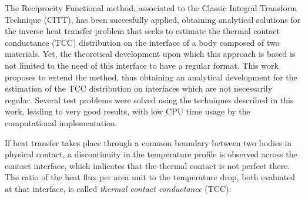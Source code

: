 \documentclass[conference,compsoc,fleqn]{IEEEtran}
\begin{document}




\maketitle


The Reciprocity Functional method, associated to the Classic Integral Transform Technique (CITT), has been succesfully applied, obtaining analytical
solutions for the inverse heat transfer problem that seeks to estimate the thermal contact conductance (TCC) distribution on the interface of a body composed of
two materials. Yet, the theoretical development upon which this approach is based is not limited to the need of this interface to have a regular format.
This work proposes to extend the method, thus obtaining an analytical development for the estimation of the TCC distribution on interfaces which
are not necessarily regular. Several test problems were solved using the techniques described in this work, leading to very good results, with low CPU time usage by the computational implementation.
\\





%

\IEEEpeerreviewmaketitle



If heat transfer takes place through a common boundary between two bodies in physical contact, a discontinuity in the temperature profile is observed across the contact interface, which indicates that the thermal contact is not perfect there. The ratio of the heat flux per area unit to the temperature drop, both evaluated at that interface, is called \textit{thermal contact conductance} (TCC):
\end{document}
